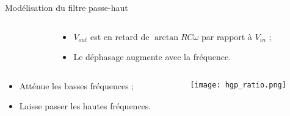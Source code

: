 \documentclass[pdf]{beamer}
\begin{document}
\begin{frame}{Modélisation du filtre passe-haut}
	\begin{columns}
		\begin{column}{5cm}
		\end{column}

		\begin{column}{5cm}
			\begin{itemize}
				\item $V_{out}$ est en retard de $\arctan{RC\omega}$ par rapport à $V_{in}$ ;
				\item Le déphasage augmente avec la fréquence.
			\end{itemize}
		\end{column}
	\end{columns}

	\begin{columns}
		\begin{column}{5cm}
			\begin{itemize}
				\item Atténue les basses fréquences ;
				\item Laisse passer les hautes fréquences.
			\end{itemize}
		\end{column}

		\begin{column}{5cm}
			\scalebox{0.5}
			{\texttt{[image: hgp\_ratio.png]}}
		\end{column}
	\end{columns}
\end{frame}
\end{document}
